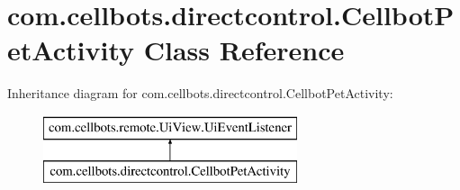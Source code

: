 \hypertarget{classcom_1_1cellbots_1_1directcontrol_1_1_cellbot_pet_activity}{\section{com.\-cellbots.\-directcontrol.\-Cellbot\-Pet\-Activity Class Reference}
\label{classcom_1_1cellbots_1_1directcontrol_1_1_cellbot_pet_activity}
}
Inheritance diagram for com.\-cellbots.\-directcontrol.\-Cellbot\-Pet\-Activity\-:\begin{figure}[H]
\begin{center}
\leavevmode
\includegraphics[height=2.000000cm]{classcom_1_1cellbots_1_1directcontrol_1_1_cellbot_pet_activity}
\end{center}
\end{figure}
